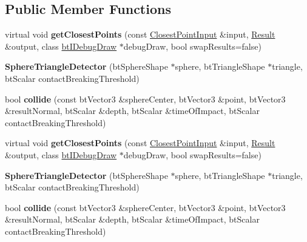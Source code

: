 \subsection*{Public Member Functions}
\begin{DoxyCompactItemize}
\item 
\mbox{\label{structSphereTriangleDetector_adb974f84a9f7359d89a8a88af08de74f}} 
virtual void {\bfseries get\+Closest\+Points} (const \hyperlink{structbtDiscreteCollisionDetectorInterface_1_1ClosestPointInput}{Closest\+Point\+Input} \&input, \hyperlink{structbtDiscreteCollisionDetectorInterface_1_1Result}{Result} \&output, class \hyperlink{classbtIDebugDraw}{bt\+I\+Debug\+Draw} $\ast$debug\+Draw, bool swap\+Results=false)
\item 
\mbox{\label{structSphereTriangleDetector_a747f233ff1baeb269d4ecd7d42c49870}} 
{\bfseries Sphere\+Triangle\+Detector} (bt\+Sphere\+Shape $\ast$sphere, bt\+Triangle\+Shape $\ast$triangle, bt\+Scalar contact\+Breaking\+Threshold)
\item 
\mbox{\label{structSphereTriangleDetector_a21942d541c626d8958d28abc1d2ca5aa}} 
bool {\bfseries collide} (const bt\+Vector3 \&sphere\+Center, bt\+Vector3 \&point, bt\+Vector3 \&result\+Normal, bt\+Scalar \&depth, bt\+Scalar \&time\+Of\+Impact, bt\+Scalar contact\+Breaking\+Threshold)
\item 
\mbox{\label{structSphereTriangleDetector_ab553f7c90571827d42cd7b3b83e32f64}} 
virtual void {\bfseries get\+Closest\+Points} (const \hyperlink{structbtDiscreteCollisionDetectorInterface_1_1ClosestPointInput}{Closest\+Point\+Input} \&input, \hyperlink{structbtDiscreteCollisionDetectorInterface_1_1Result}{Result} \&output, class \hyperlink{classbtIDebugDraw}{bt\+I\+Debug\+Draw} $\ast$debug\+Draw, bool swap\+Results=false)
\item 
\mbox{\label{structSphereTriangleDetector_a747f233ff1baeb269d4ecd7d42c49870}} 
{\bfseries Sphere\+Triangle\+Detector} (bt\+Sphere\+Shape $\ast$sphere, bt\+Triangle\+Shape $\ast$triangle, bt\+Scalar contact\+Breaking\+Threshold)
\item 
\mbox{\label{structSphereTriangleDetector_a21942d541c626d8958d28abc1d2ca5aa}} 
bool {\bfseries collide} (const bt\+Vector3 \&sphere\+Center, bt\+Vector3 \&point, bt\+Vector3 \&result\+Normal, bt\+Scalar \&depth, bt\+Scalar \&time\+Of\+Impact, bt\+Scalar contact\+Breaking\+Threshold)
\end{DoxyCompactItemize}


